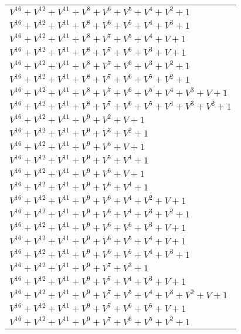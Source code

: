 \documentclass[12pt]{article}
\begin{document}
\begin{adjustwidth}{-4cm}{}
\begin{center}
\begin{longtable}{|l|}
$V^{16}  +V^{12}  +V^{11}  +V^{8}  +V^{6}  +V^{5}  +V^{4}  +V^{2}  + 1$ \\
$V^{16}  +V^{12}  +V^{11}  +V^{8}  +V^{6}  +V^{5}  +V^{4}  +V^{3}  + 1$ \\
$V^{16}  +V^{12}  +V^{11}  +V^{8}  +V^{7}  +V^{5}  +V^{4}  + V + 1$ \\
$V^{16}  +V^{12}  +V^{11}  +V^{8}  +V^{7}  +V^{6}  +V^{3}  + V + 1$ \\
$V^{16}  +V^{12}  +V^{11}  +V^{8}  +V^{7}  +V^{6}  +V^{3}  +V^{2}  + 1$ \\
$V^{16}  +V^{12}  +V^{11}  +V^{8}  +V^{7}  +V^{6}  +V^{5}  +V^{2}  + 1$ \\
$V^{16}  +V^{12}  +V^{11}  +V^{8}  +V^{7}  +V^{6}  +V^{5}  +V^{4}  +V^{3}  + V + 1$ \\
$V^{16}  +V^{12}  +V^{11}  +V^{8}  +V^{7}  +V^{6}  +V^{5}  +V^{4}  +V^{3}  +V^{2}  + 1$ \\
$V^{16}  +V^{12}  +V^{11}  +V^{9}  +V^{2}  + V + 1$ \\
$V^{16}  +V^{12}  +V^{11}  +V^{9}  +V^{3}  +V^{2}  + 1$ \\
$V^{16}  +V^{12}  +V^{11}  +V^{9}  +V^{5}  + V + 1$ \\
$V^{16}  +V^{12}  +V^{11}  +V^{9}  +V^{5}  +V^{4}  + 1$ \\
$V^{16}  +V^{12}  +V^{11}  +V^{9}  +V^{6}  + V + 1$ \\
$V^{16}  +V^{12}  +V^{11}  +V^{9}  +V^{6}  +V^{4}  + 1$ \\
$V^{16}  +V^{12}  +V^{11}  +V^{9}  +V^{6}  +V^{4}  +V^{2}  + V + 1$ \\
$V^{16}  +V^{12}  +V^{11}  +V^{9}  +V^{6}  +V^{4}  +V^{3}  +V^{2}  + 1$ \\
$V^{16}  +V^{12}  +V^{11}  +V^{9}  +V^{6}  +V^{5}  +V^{3}  + V + 1$ \\
$V^{16}  +V^{12}  +V^{11}  +V^{9}  +V^{6}  +V^{5}  +V^{4}  + V + 1$ \\
$V^{16}  +V^{12}  +V^{11}  +V^{9}  +V^{6}  +V^{5}  +V^{4}  +V^{3}  + 1$ \\
$V^{16}  +V^{12}  +V^{11}  +V^{9}  +V^{7}  +V^{3}  + 1$ \\
$V^{16}  +V^{12}  +V^{11}  +V^{9}  +V^{7}  +V^{4}  +V^{3}  + V + 1$ \\
$V^{16}  +V^{12}  +V^{11}  +V^{9}  +V^{7}  +V^{5}  +V^{4}  +V^{3}  +V^{2}  + V + 1$ \\
$V^{16}  +V^{12}  +V^{11}  +V^{9}  +V^{7}  +V^{6}  +V^{5}  + V + 1$ \\
$V^{16}  +V^{12}  +V^{11}  +V^{9}  +V^{7}  +V^{6}  +V^{5}  +V^{2}  + 1$ \\

\end{longtable}
\end{center}
\end{adjustwidth}
\end{document}
